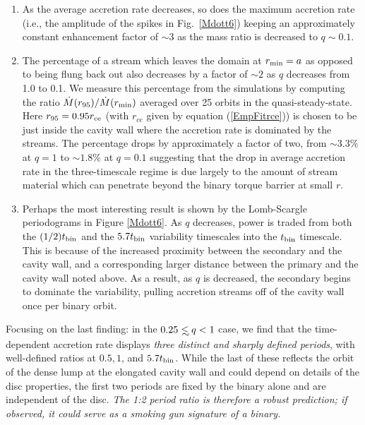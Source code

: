 \begin{enumerate}
\item As the average accretion rate decreases, so does the maximum
  accretion rate (i.e., the amplitude of the spikes in
  Fig.~\ref{Mdott6}) keeping an approximately constant enhancement factor of $\sim3$
  as the mass ratio is decreased to
  $q\sim 0.1$.  
  

\item The percentage of a stream which leaves the domain at $r_{\rm{min}} =a$ as opposed to being flung back out also decreases by a factor of $\sim2$ as $q$ decreases from 1.0 to 0.1. We measure this 
  percentage from the simulations by computing the ratio $\dot{M}(r_{95})/\dot{M}(r_{\rm min})$ averaged over 25 orbits in the quasi-steady-state. Here $r_{95} = 0.95 r_{\rm{ce}}$ (with $r_{ce}$ given by equation 
  (\ref{EmpFitrce})) is chosen to be just inside the cavity wall where the accretion rate is dominated by the streams. The percentage drops by approximately a factor of two, from $\sim 3.3 \%$ at $q=1$ to 
  $\sim1.8 \%$ at $q=0.1$ suggesting that the drop in average accretion rate in the three-timescale regime is due largely to the amount of stream material which can penetrate beyond the binary torque barrier at small $r$.


\item Perhaps the most interesting result is shown by the Lomb-Scargle
  periodograms in Figure \ref{Mdott6}. As $q$ decreases, power is
  traded from both the $(1/2)t_{\rm bin}$ and the $5.7t_{\rm
    bin}$ variability timescales into the $t_{\rm bin}$ timescale.
  This is because of the increased proximity between the secondary and
  the cavity wall, and a corresponding larger distance between the
  primary and the cavity wall noted above.  As a result, as $q$ is
  decreased, the secondary begins to dominate the variability, pulling 
  accretion streams off of the cavity wall once per binary orbit.

\end{enumerate}


Focusing on the last finding: in the $0.25 \lsim q < 1$ case, we find
that the time-dependent accretion rate displays {\em three distinct
  and sharply defined periods}, with well-defined ratios at $0.5, 1$,
and $5.7t_{\rm bin}$.  While the last of these reflects the orbit of the
dense lump at the elongated cavity wall and could depend on details of the disc
properties, the first two periods are fixed by the binary alone and
are independent of the disc.  {\em The 1:2 period ratio is therefore a
robust prediction; if observed, it could serve as a smoking gun
signature of a binary.}



